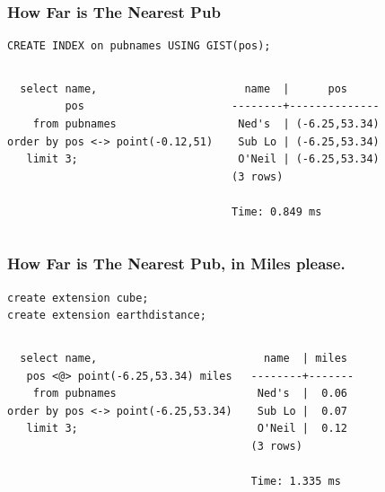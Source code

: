 \documentclass{beamer}
\begin{document}
\begin{frame}[fragile]
  \frametitle{How Far is The Nearest Pub}

\begin{center}
\begin{verbatim}
CREATE INDEX on pubnames USING GIST(pos);
\end{verbatim}  
\end{center}
\vfill

\begin{columns}
\begin{verbatim}
  select name,
         pos
    from pubnames
order by pos <-> point(-0.12,51)
   limit 3;
\end{verbatim}  

\begin{verbatim}
  name  |      pos           
--------+--------------
 Ned's  | (-6.25,53.34)
 Sub Lo | (-6.25,53.34)
 O'Neil | (-6.25,53.34)
(3 rows)

Time: 0.849 ms
\end{verbatim}  
\end{columns}
\end{frame}

\begin{frame}[fragile]
  \frametitle{How Far is The Nearest Pub, in Miles please.}

\begin{verbatim}
create extension cube;
create extension earthdistance;
\end{verbatim}  
\vfill

\begin{columns}
\begin{verbatim}
  select name,
   pos <@> point(-6.25,53.34) miles
    from pubnames
order by pos <-> point(-6.25,53.34)
   limit 3;
\end{verbatim}  
\begin{verbatim}
  name  | miles 
--------+-------
 Ned's  |  0.06
 Sub Lo |  0.07
 O'Neil |  0.12
(3 rows)

Time: 1.335 ms
\end{verbatim}  
\end{columns}
\end{frame}
\end{document}
